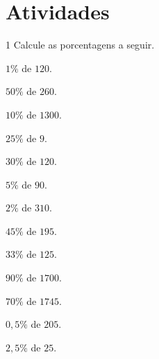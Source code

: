 \section*{Atividades}

\num{1} Calcule as porcentagens a seguir.

\begin{escolha}
\item $1\%$ de $120$.


\item $50\%$ de $260$.


\item $10\%$ de $1300$.


\item $25\%$ de $9$.


\item $30\%$ de $120$.


\item $5\%$ de $90$.


\item $2\%$ de $310$.


\item $45\%$ de $195$.


\item $33\%$ de $125$.


\item $90\%$ de $1700$.


\item $70\%$ de $1745$.


\item $0,5\%$ de $205$.


\item $2,5\%$ de $25$.


\end{escolha}

